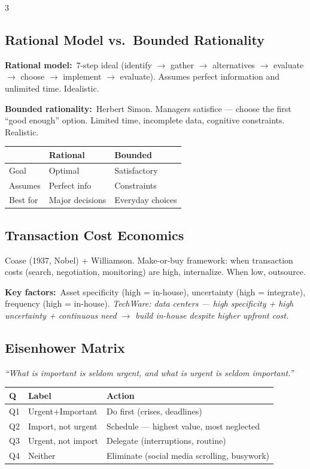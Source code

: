 \documentclass[7.6pt,letterpaper]{article}
\newcommand{\T}[1]{\textbf{\color{navy}#1}}
\newcommand{\kk}[2]{\noindent\T{#1}\ #2\par}
\newcommand{\eg}[1]{\textit{\color{mid}#1}}
\newcommand{\sh}{\rowcolor{strip}}
\newcommand{\ctab}[1]{{\fontsize{6.2pt}{7pt}\selectfont\setlength{\tabcolsep}{2.5pt}#1}}
\begin{document}
\begin{multicols}{3}
\subsection{Rational Model vs.\ Bounded Rationality}

\kk{Rational model:}{7-step ideal (identify $\to$ gather $\to$ alternatives $\to$ evaluate $\to$ choose $\to$ implement $\to$ evaluate). Assumes perfect information and unlimited time. Idealistic.}
\kk{Bounded rationality:}{Herbert Simon. Managers satisfice --- choose the first ``good enough'' option. Limited time, incomplete data, cognitive constraints. Realistic.}

\ctab{\begin{tabular}{@{}p{1.8cm}p{1.7cm}p{2.1cm}@{}}
\toprule
\sh & \T{Rational} & \T{Bounded} \\
\midrule
Goal & Optimal & Satisfactory \\
Assumes & Perfect info & Constraints \\
Best for & Major decisions & Everyday choices \\
\bottomrule
\end{tabular}}

\subsection{Transaction Cost Economics}

Coase (1937, Nobel) + Williamson. Make-or-buy framework: when transaction costs (search, negotiation, monitoring) are high, internalize. When low, outsource.

\kk{Key factors:}{Asset specificity (high = in-house), uncertainty (high = integrate), frequency (high = in-house). \eg{TechWare: data centers --- high specificity + high uncertainty + continuous need $\to$ build in-house despite higher upfront cost.}}

\subsection{Eisenhower Matrix}

\textit{``What is important is seldom urgent, and what is urgent is seldom important.''}

\ctab{\begin{tabular}{@{}p{0.8cm}p{1.5cm}p{2.9cm}@{}}
\toprule
\sh \T{Q} & \T{Label} & \T{Action} \\
\midrule
Q1 & Urgent+Important & Do first (crises, deadlines) \\
Q2 & Import, not urgent & Schedule --- highest value, most neglected \\
Q3 & Urgent, not import & Delegate (interruptions, routine) \\
Q4 & Neither & Eliminate (social media scrolling, busywork) \\
\bottomrule
\end{tabular}}


\end{multicols}
\end{document}
